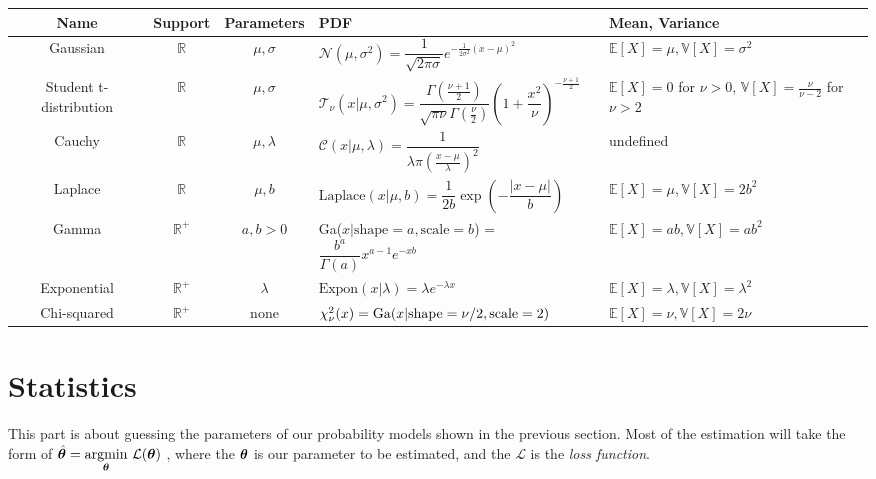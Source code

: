 \documentclass{report}
\begin{document}
\begin{center}
\begin{tabularx}{\textwidth}{c c c X X}
    \toprule
    \textbf{Name} & \textbf{Support} & \textbf{Parameters} & \textbf{PDF} & \textbf{Mean, Variance} \\
    \midrule
    Gaussian &
    \(\mathbb R\) &
    \(\mu, \sigma\) &
    \(\mathcal N(\mu, \sigma^2)=\dfrac{1}{\sqrt{2\pi\sigma}}e^{-\frac{1}{2\sigma^2}(x-\mu)^2}\) &
    \(\mathbb{E}[X] = \mu, \mathbb{V}[X] = \sigma^2\)
    \\
    \midrule
    Student t-distribution &
    \(\mathbb R\) &
    \(\mu, \sigma\) &
    \(\mathcal T_\nu(x|\mu, \sigma^2)=\dfrac{\Gamma(\frac{\nu+1}{2})}{\sqrt{\pi\nu}\Gamma(\frac{\nu}{2})}\left(1+\dfrac{x^2}{\nu}\right)^{-\frac{\nu+1}{2}}\) &
    \(\mathbb E[X] = 0\) for \(\nu>0\), \(\mathbb V[X] = \frac{\nu}{\nu - 2}\) for \(\nu > 2 \)
    \\
    \midrule
    Cauchy &
    \(\mathbb R\) &
    \(\mu,\lambda\) &
    \(\mathcal C(x|\mu,\lambda)=\dfrac{1}{\lambda\pi(\frac{x-\mu}{\lambda})^2}\) &
    undefined
    \\
    \midrule
    Laplace &
    \(\mathbb R\) &
    \(\mu, b\) &
    \(\text{Laplace}(x|\mu, b) = \dfrac{1}{2b}\exp\left(-\dfrac{|x-\mu|}{b}\right)\) &
    \(\mathbb E[X] = \mu, \mathbb V[X] = 2b^2\)
    \\
    \midrule
    Gamma &
    \(\mathbb R^+\) &
    \(a, b > 0\) &
    Ga($x|\text{shape} = a, \text{scale} = b$) = \(\dfrac{b^a}{\Gamma(a)}x^{a-1}e^{-xb}\) &
    \(\mathbb{E}[X] = ab, \mathbb{V}[X] = ab^2\)
    \\
    \midrule
    Exponential &
    $\mathbb R^+$ &
    $\lambda$ &
    $\text{Expon}(x|\lambda) = \lambda e^{-\lambda x}$ &
    $\mathbb{E}[X] = \lambda, \mathbb{V}[X] = \lambda^2$
    \\
    \midrule
    Chi-squared &
    $\mathbb R^+$ &
    none &
    $\chi_{\nu}^{2}(x) = \newline \text{Ga}(x|\text{shape} = \nu/2, \text{scale} = 2)$ &
    $\mathbb{E}[X] = \nu, \mathbb{V}[X] = 2\nu $
    \\
    \bottomrule
\end{tabularx}
\end{center}

\chapter{Statistics}
This part is about guessing the parameters of our probability models shown in the previous section.
Most of the estimation will take the form of
$\hat{\boldsymbol{\theta}} =
\underset{\boldsymbol{\theta}}{\text{argmin}}\ \mathcal L(\boldsymbol{\theta})$
, where the $\boldsymbol{\theta}$ is our parameter to be estimated, and the $\mathcal L$ is the \emph{loss function}.
\end{document}
